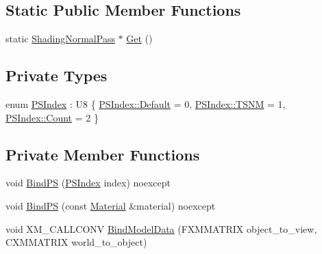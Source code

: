\subsection*{Static Public Member Functions}
\begin{DoxyCompactItemize}
\item 
static \hyperlink{classmage_1_1_shading_normal_pass}{Shading\+Normal\+Pass} $\ast$ \hyperlink{classmage_1_1_shading_normal_pass_a27351f21b0e5d780b9c68e01f1428ace}{Get} ()
\end{DoxyCompactItemize}
\subsection*{Private Types}
\begin{DoxyCompactItemize}
\item 
enum \hyperlink{classmage_1_1_shading_normal_pass_a05bd054001817e1f57cd5cd41e2e522e}{P\+S\+Index} \+: U8 \{ \hyperlink{classmage_1_1_shading_normal_pass_a05bd054001817e1f57cd5cd41e2e522ea7a1920d61156abc05a60135aefe8bc67}{P\+S\+Index\+::\+Default} = 0, 
\hyperlink{classmage_1_1_shading_normal_pass_a05bd054001817e1f57cd5cd41e2e522ea6e02c9f63944ea221e7d55c11ecae07b}{P\+S\+Index\+::\+T\+S\+NM} = 1, 
\hyperlink{classmage_1_1_shading_normal_pass_a05bd054001817e1f57cd5cd41e2e522eae93f994f01c537c4e2f7d8528c3eb5e9}{P\+S\+Index\+::\+Count} = 2
 \}
\end{DoxyCompactItemize}
\subsection*{Private Member Functions}
\begin{DoxyCompactItemize}
\item 
void \hyperlink{classmage_1_1_shading_normal_pass_ab691c2125f9e21c7e70f2737037504bc}{Bind\+PS} (\hyperlink{classmage_1_1_shading_normal_pass_a05bd054001817e1f57cd5cd41e2e522e}{P\+S\+Index} index) noexcept
\item 
void \hyperlink{classmage_1_1_shading_normal_pass_a220c66c7fdbbb16cfeb8515e435cd846}{Bind\+PS} (const \hyperlink{classmage_1_1_material}{Material} \&material) noexcept
\item 
void X\+M\+\_\+\+C\+A\+L\+L\+C\+O\+NV \hyperlink{classmage_1_1_shading_normal_pass_adbaa57a7ff6bc885bf2ab890b0f933d4}{Bind\+Model\+Data} (F\+X\+M\+M\+A\+T\+R\+IX object\+\_\+to\+\_\+view, C\+X\+M\+M\+A\+T\+R\+IX world\+\_\+to\+\_\+object)
\end{DoxyCompactItemize}
